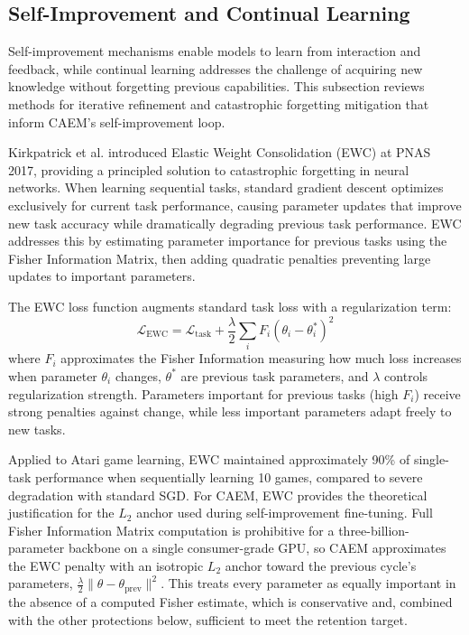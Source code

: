 \subsection{Self-Improvement and Continual Learning}

Self-improvement mechanisms enable models to learn from interaction and feedback, while continual learning addresses the challenge of acquiring new knowledge without forgetting previous capabilities. This subsection reviews methods for iterative refinement and catastrophic forgetting mitigation that inform CAEM's self-improvement loop.

Kirkpatrick et al. \cite{doi:10.1073/pnas.1611835114} introduced Elastic Weight Consolidation (EWC) at PNAS 2017, providing a principled solution to catastrophic forgetting in neural networks. When learning sequential tasks, standard gradient descent optimizes exclusively for current task performance, causing parameter updates that improve new task accuracy while dramatically degrading previous task performance. EWC addresses this by estimating parameter importance for previous tasks using the Fisher Information Matrix, then adding quadratic penalties preventing large updates to important parameters.

The EWC loss function augments standard task loss with a regularization term:
\begin{equation}
\mathcal{L}_{\text{EWC}} = \mathcal{L}_{\text{task}} + \frac{\lambda}{2} \sum_{i} F_i (\theta_i - \theta_i^*)^2
\end{equation}
where $F_i$ approximates the Fisher Information measuring how much loss increases when parameter $\theta_i$ changes, $\theta^*$ are previous task parameters, and $\lambda$ controls regularization strength. Parameters important for previous tasks (high $F_i$) receive strong penalties against change, while less important parameters adapt freely to new tasks.

Applied to Atari game learning, EWC maintained approximately 90\% of single-task performance when sequentially learning 10 games, compared to severe degradation with standard SGD. For CAEM, EWC provides the theoretical justification for the $L_2$ anchor used during self-improvement fine-tuning. Full Fisher Information Matrix computation is prohibitive for a three-billion-parameter backbone on a single consumer-grade GPU, so CAEM approximates the EWC penalty with an isotropic $L_{2}$ anchor toward the previous cycle's parameters, $\frac{\lambda}{2}\lVert \theta - \theta_{\text{prev}} \rVert^{2}$. This treats every parameter as equally important in the absence of a computed Fisher estimate, which is conservative and, combined with the other protections below, sufficient to meet the retention target.

